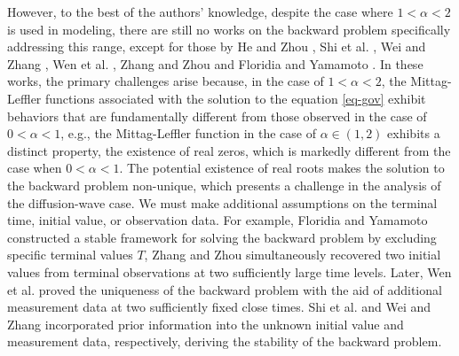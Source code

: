 \documentclass[11pt]{article}
\numberwithin{equation}{section}
\begin{document}
However, to the best of the authors' knowledge, despite the case where $1<\alpha<2$ is used in modeling, there are still no works on the backward problem specifically addressing this range, except for those by He and Zhou \cite{He2022backward}, Shi et al. \cite{Shi2023backward}, Wei and Zhang \cite{Wei2018backward}, Wen et al. \cite{Wen2023solving}, Zhang and Zhou \cite{Zhang2022backward} and Floridia and Yamamoto \cite{floridia2020backward}. In these works, the primary challenges arise because, in the case of $1<\alpha<2$, the Mittag-Leffler functions associated with the solution to the equation \eqref{eq-gov} exhibit behaviors that are fundamentally different from those observed in the case of $0<\alpha<1$, e.g., the Mittag-Leffler function in the case of $\alpha\in(1,2)$ exhibits a distinct property, the existence of real zeros, which is markedly different from the case when $0 < \alpha < 1$. The potential existence of real roots makes the solution to the backward problem non-unique, which presents a challenge in the analysis of the diffusion-wave case. We must make additional assumptions on the terminal time, initial value, or observation data. For example, Floridia and Yamamoto \cite{floridia2020backward} constructed a stable framework for solving the backward problem by excluding specific terminal values $T$, Zhang and Zhou \cite{Zhang2022backward} simultaneously recovered two initial values from terminal observations at two sufficiently large time levels. Later, Wen et al. \cite{Wen2023solving} proved the uniqueness of the backward problem with the aid of additional measurement data at two sufficiently fixed close times. Shi et al. \cite{Shi2023backward} and Wei and Zhang \cite{Wei2018backward} incorporated prior information into the unknown initial value and measurement data, respectively, deriving the stability of the backward problem.
\end{document}
